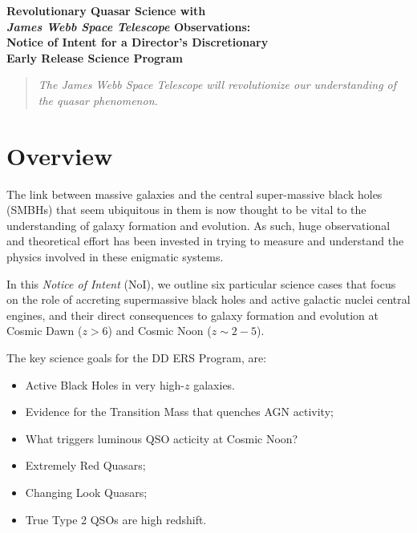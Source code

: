 \documentclass[11pt,epsf]{article}
\begin{document}
\vspace{-44pt} 
\begin{center}
  {\Large \bf Revolutionary Quasar Science with \\ 
    {\it James Webb Space Telescope} Observations:\\
    Notice of Intent for a Director's Discretionary \\
    Early Release Science Program\\}
\end{center}

\begin{quotation}
\noindent
{\it  The James Webb Space Telescope will revolutionize 
our understanding of the quasar phenomenon. 

}
\noindent
\end{quotation}


\section*{Overview}

The link between massive galaxies and the central super-massive black
holes (SMBHs) that seem ubiquitous in them is now thought to be vital
to the understanding of galaxy formation and evolution.  As such, huge
observational and theoretical effort has been invested in trying to
measure and understand the physics involved in these enigmatic
systems.

\smallskip
\smallskip
\noindent
In this {\it Notice of Intent} (NoI), we outline six particular science
cases that focus on the role of accreting supermassive black holes and
active galactic nuclei central engines, and their direct consequences
to galaxy formation and evolution at Cosmic Dawn ($z>6$) and Cosmic
Noon ($z\sim2-5$).

\smallskip
\smallskip
\noindent
The key science goals for the DD ERS Program, are: 
\begin{itemize}
    \item{Active Black Holes in very high-$z$ galaxies.} 
    \item{Evidence for the Transition Mass that quenches AGN activity;}
    \item{What triggers luminous QSO acticity at Cosmic Noon?}
    \item{Extremely Red Quasars;}
    \item{Changing Look Quasars;}
    \item{True Type 2 QSOs are high redshift.}
\end{itemize}
\end{document}
